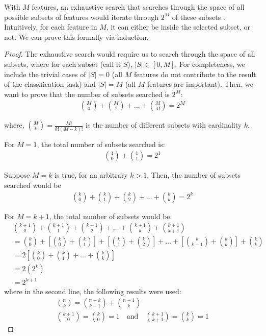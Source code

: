 \documentclass[12pt, twoside, a4paper]{report}
\begin{document}
With $M$ features, an exhaustive search that searches through the space of all possible subsets of features would iterate through $2^M$ of these subsets \cite{RefWorks:182}. Intuitively, for each feature in $M$, it can either be inside the selected subset, or not. We can prove this formally via induction.

\begin{proof}
The exhaustive search would require us to search through the space of all subsets, where for each subset (call it $S$), $|S| \in \left[ 0, M \right]$. For completeness, we include the trivial cases of $|S|=0$ (all $M$ features do not contribute to the result of the classification task) and $|S|=M$ (all $M$ features are important). Then, we want to prove that the number of subsets searched is $2^M$:
\begin{align*}
{{M}\choose{0}} + {{M}\choose{1}} + \dots + {{M}\choose{M}} = 2^M
\end{align*}

where, ${{M}\choose{k}} = \frac{M!}{k!(M-k)!}$ is the number of different subsets with cardinality $k$. 

For $M=1$, the total number of subsets searched is:
\begin{align*}
{{1}\choose{0}} + {{1}\choose{1}} = 2^1
\end{align*}

Suppose $M=k$ is true, for an arbitrary $k>1$. Then, the number of subsets searched would be
\begin{align*}
{{k}\choose{0}} + {{k}\choose{1}} + {{k}\choose{2}} + \dots + {{k}\choose{k}} = 2^k 
\end{align*}

For $M=k+1$, the total number of subsets would be:
\begin{align*}
&{{k+1}\choose{0}} + {{k+1}\choose{1}} + {{k+1}\choose{2}} + \dots + {{k+1}\choose{k}} + {{k+1}\choose{k+1}} \\
&= {{k}\choose{0}} + \left[ {{k}\choose{0}} + {{k}\choose{1}} \right] + \left[ {{k}\choose{1}} + {{k}\choose{2}} \right] + \dots + \left[ {{k}\choose{k-1}} + {{k}\choose{k}} \right] + {{k}\choose{k}} \\
&= 2 \left[ {{k}\choose{0}} + {{k}\choose{1}} + \dots + {{k}\choose{k}} \right] \\
&= 2 \left(2^k \right) \\
&= 2^{k+1}
\end{align*}
where in the second line, the following results were used:
\begin{gather*}
{{n}\choose{k}} = {{n-k}\choose{k-1}} + {{n-1}\choose{k}} \\
{{k+1}\choose{0}} = {{k}\choose{0}} = 1 \quad \text{and} \quad {{k+1}\choose{k+1}} = {{k}\choose{k}} = 1
\end{gather*}
\end{proof}
\end{document}
